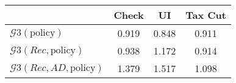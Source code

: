 \begin{tabular}{@{}lccc@{}} 
\toprule 
                          & Check      & UI    & Tax Cut    \\  \midrule 
$\mathcal{G}3(\text{policy})$ & 0.919  & 0.848  & 0.911     \\ 
$\mathcal{G}3(Rec,\text{policy})$ & 0.938  & 1.172  & 0.914     \\ 
$\mathcal{G}3(Rec, AD,\text{policy})$ & 1.379  & 1.517  & 1.098     \\ 
\end{tabular}  
